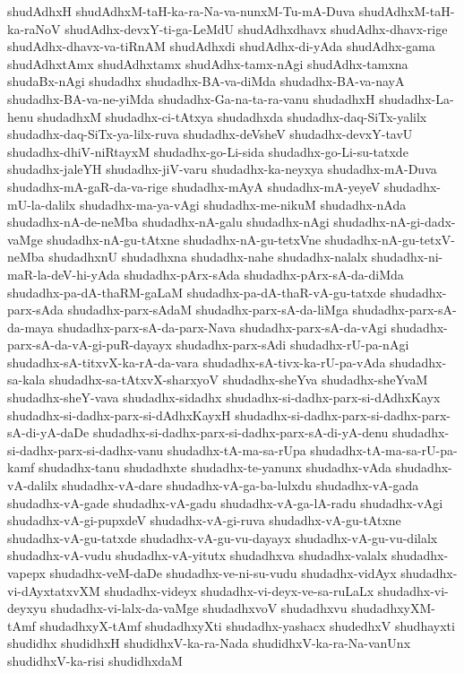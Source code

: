 {shudAdhxH
shudAdhxM-taH-ka-ra-Na-va-nunxM-Tu-mA-Duva
shudAdhxM-taH-ka-raNoV
shudAdhx-devxY-ti-ga-LeMdU
shudAdhxdhavx
shudAdhx-dhavx-rige
shudAdhx-dhavx-va-tiRnAM
shudAdhxdi
shudAdhx-di-yAda
shudAdhx-gama
shudAdhxtAmx
shudAdhxtamx
shudAdhx-tamx-nAgi
shudAdhx-tamxna
shudaBx-nAgi
shudadhx
shudadhx-BA-va-diMda
shudadhx-BA-va-nayA
shudadhx-BA-va-ne-yiMda
shudadhx-Ga-na-ta-ra-vanu
shudadhxH
shudadhx-La-henu
shudadhxM
shudadhx-ci-tAtxya
shudadhxda
shudadhx-daq-SiTx-yalilx
shudadhx-daq-SiTx-ya-lilx-ruva
shudadhx-deVsheV
shudadhx-devxY-tavU
shudadhx-dhiV-niRtayxM
shudadhx-go-Li-sida
shudadhx-go-Li-su-tatxde
shudadhx-jaleYH
shudadhx-jiV-varu
shudadhx-ka-neyxya
shudadhx-mA-Duva
shudadhx-mA-gaR-da-va-rige
shudadhx-mAyA
shudadhx-mA-yeyeV
shudadhx-mU-la-dalilx
shudadhx-ma-ya-vAgi
shudadhx-me-nikuM
shudadhx-nAda
shudadhx-nA-de-neMba
shudadhx-nA-galu
shudadhx-nAgi
shudadhx-nA-gi-dadx-vaMge
shudadhx-nA-gu-tAtxne
shudadhx-nA-gu-tetxVne
shudadhx-nA-gu-tetxV-neMba
shudadhxnU
shudadhxna
shudadhx-nahe
shudadhx-nalalx
shudadhx-ni-maR-la-deV-hi-yAda
shudadhx-pArx-sAda
shudadhx-pArx-sA-da-diMda
shudadhx-pa-dA-thaRM-gaLaM
shudadhx-pa-dA-thaR-vA-gu-tatxde
shudadhx-parx-sAda
shudadhx-parx-sAdaM
shudadhx-parx-sA-da-liMga
shudadhx-parx-sA-da-maya
shudadhx-parx-sA-da-parx-Nava
shudadhx-parx-sA-da-vAgi
shudadhx-parx-sA-da-vA-gi-puR-dayayx
shudadhx-parx-sAdi
shudadhx-rU-pa-nAgi
shudadhx-sA-titxvX-ka-rA-da-vara
shudadhx-sA-tivx-ka-rU-pa-vAda
shudadhx-sa-kala
shudadhx-sa-tAtxvX-sharxyoV
shudadhx-sheYva
shudadhx-sheYvaM
shudadhx-sheY-vava
shudadhx-sidadhx
shudadhx-si-dadhx-parx-si-dAdhxKayx
shudadhx-si-dadhx-parx-si-dAdhxKayxH
shudadhx-si-dadhx-parx-si-dadhx-parx-sA-di-yA-daDe
shudadhx-si-dadhx-parx-si-dadhx-parx-sA-di-yA-denu
shudadhx-si-dadhx-parx-si-dadhx-vanu
shudadhx-tA-ma-sa-rUpa
shudadhx-tA-ma-sa-rU-pa-kamf
shudadhx-tanu
shudadhxte
shudadhx-te-yanunx
shudadhx-vAda
shudadhx-vA-dalilx
shudadhx-vA-dare
shudadhx-vA-ga-ba-lulxdu
shudadhx-vA-gada
shudadhx-vA-gade
shudadhx-vA-gadu
shudadhx-vA-ga-lA-radu
shudadhx-vAgi
shudadhx-vA-gi-pupxdeV
shudadhx-vA-gi-ruva
shudadhx-vA-gu-tAtxne
shudadhx-vA-gu-tatxde
shudadhx-vA-gu-vu-dayayx
shudadhx-vA-gu-vu-dilalx
shudadhx-vA-vudu
shudadhx-vA-yitutx
shudadhxva
shudadhx-valalx
shudadhx-vapepx
shudadhx-veM-daDe
shudadhx-ve-ni-su-vudu
shudadhx-vidAyx
shudadhx-vi-dAyxtatxvXM
shudadhx-videyx
shudadhx-vi-deyx-ve-sa-ruLaLx
shudadhx-vi-deyxyu
shudadhx-vi-lalx-da-vaMge
shudadhxvoV
shudadhxvu
shudadhxyXM-tAmf
shudadhxyX-tAmf
shudadhxyXti
shudadhx-yashacx
shudedhxV
shudhayxti
shudidhx
shudidhxH
shudidhxV-ka-ra-Nada
shudidhxV-ka-ra-Na-vanUnx
shudidhxV-ka-risi
shudidhxdaM
}
